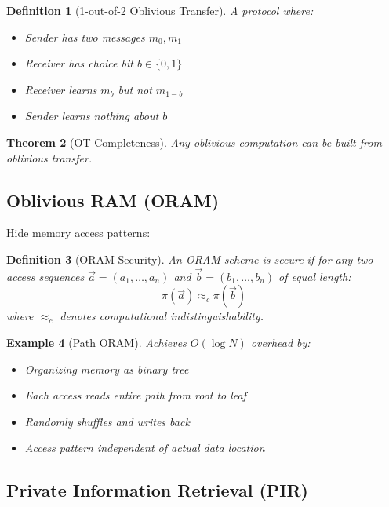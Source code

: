\documentclass[11pt,final]{article}
\newtheorem{theorem}{Theorem}[section]
\newtheorem{definition}[theorem]{Definition}
\newtheorem{example}[theorem]{Example}
\renewcommand{\Pattern}[1]{\pi(#1)}
\begin{document}
\begin{definition}[1-out-of-2 Oblivious Transfer]
A protocol where:
\begin{itemize}
    \item Sender has two messages $m_0, m_1$
    \item Receiver has choice bit $b \in \{0,1\}$
    \item Receiver learns $m_b$ but not $m_{1-b}$
    \item Sender learns nothing about $b$
\end{itemize}
\end{definition}

\begin{theorem}[OT Completeness]
Any oblivious computation can be built from oblivious transfer.
\end{theorem}

\subsection{Oblivious RAM (ORAM)}

Hide memory access patterns:

\begin{definition}[ORAM Security]
An ORAM scheme is secure if for any two access sequences $\vec{a} = (a_1, \ldots, a_n)$ and $\vec{b} = (b_1, \ldots, b_n)$ of equal length:
\begin{equation}
\Pattern{\vec{a}} \approx_c \Pattern{\vec{b}}
\end{equation}
where $\approx_c$ denotes computational indistinguishability.
\end{definition}

\begin{example}[Path ORAM]
Achieves $O(\log N)$ overhead by:
\begin{itemize}
    \item Organizing memory as binary tree
    \item Each access reads entire path from root to leaf
    \item Randomly shuffles and writes back
    \item Access pattern independent of actual data location
\end{itemize}
\end{example}

\subsection{Private Information Retrieval (PIR)}
\end{document}
